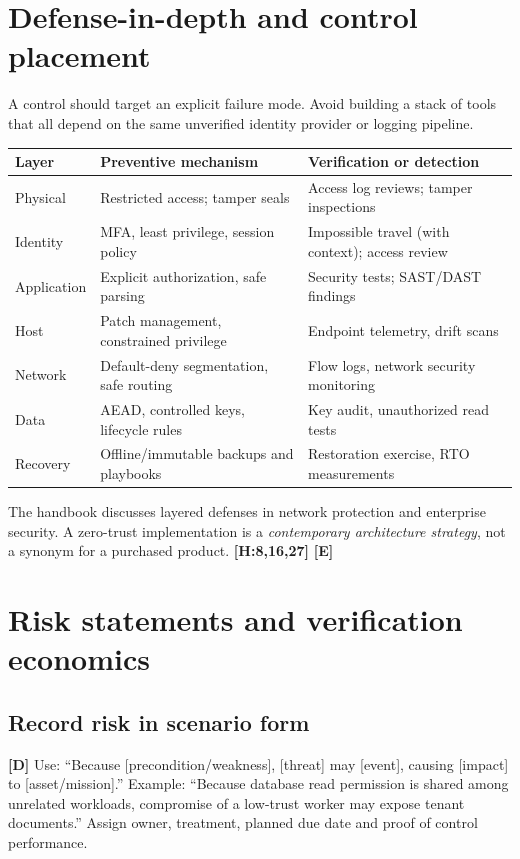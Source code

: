 \documentclass[10pt,letterpaper,oneside]{article}
\newcommand{\handbookref}[1]{\textsf{\color{accent}\textbf{[H:#1]}}}
\newcommand{\modernext}{\textsf{\color{muted}\textbf{[E]}}}
\newcommand{\designed}{\textsf{\color{accent}\textbf{[D]}}}
\begin{document}
\section{Defense-in-depth and control placement}
A control should target an explicit failure mode. Avoid building a stack of tools that all depend on the same unverified identity provider or logging pipeline.
\par\medskip\noindent\begin{tabularx}{\textwidth}{@{}p{}X X@{}}\toprule
Layer & Preventive mechanism & Verification or detection \\ \midrule
Physical & Restricted access; tamper seals & Access log reviews; tamper inspections\\
Identity & MFA, least privilege, session policy & Impossible travel (with context); access review\\
Application & Explicit authorization, safe parsing & Security tests; SAST/DAST findings\\
Host & Patch management, constrained privilege & Endpoint telemetry, drift scans\\
Network & Default-deny segmentation, safe routing & Flow logs, network security monitoring\\
Data & AEAD, controlled keys, lifecycle rules & Key audit, unauthorized read tests\\
Recovery & Offline/immutable backups and playbooks & Restoration exercise, RTO measurements\\
\bottomrule\end{tabularx}\par\medskip
The handbook discusses layered defenses in network protection and enterprise security. A zero-trust implementation is a \emph{contemporary architecture strategy}, not a synonym for a purchased product. \handbookref{8,16,27} \modernext{}

\section{Risk statements and verification economics}
\subsection{Record risk in scenario form}\designed{}
Use: ``Because [precondition/weakness], [threat] may [event], causing [impact] to [asset/mission].'' Example: ``Because database read permission is shared among unrelated workloads, compromise of a low-trust worker may expose tenant documents.'' Assign owner, treatment, planned due date and proof of control performance.
\end{document}
